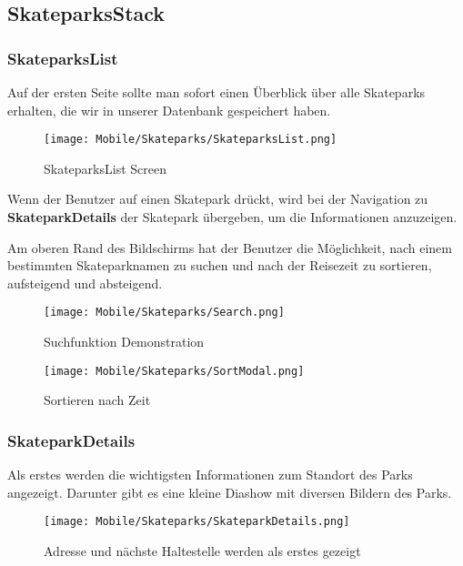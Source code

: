 \subsection{SkateparksStack}
\subsubsection{SkateparksList}
Auf der ersten Seite sollte man sofort einen Überblick über alle Skateparks erhalten, die wir in
unserer Datenbank gespeichert haben.

\begin{figure}[H]
  \begin{center}
    \texttt{[image: Mobile/Skateparks/SkateparksList.png]}
    \caption{SkateparksList Screen}
  \end{center}
\end{figure}

Wenn der Benutzer auf einen Skatepark drückt, wird bei der Navigation zu \textbf{SkateparkDetails} der
Skatepark übergeben, um die Informationen anzuzeigen.

Am oberen Rand des Bildschirms hat der Benutzer die Möglichkeit, nach einem bestimmten
Skateparknamen zu suchen und nach der Reisezeit zu sortieren, aufsteigend und absteigend.

\begin{figure}[H]
  \begin{center}
    \texttt{[image: Mobile/Skateparks/Search.png]}
    \caption{Suchfunktion Demonstration}
  \end{center}
\end{figure}

\begin{figure}[H]
  \begin{center}
    \texttt{[image: Mobile/Skateparks/SortModal.png]}
    \caption{Sortieren nach Zeit}
  \end{center}
\end{figure}

\newpage

\subsubsection{SkateparkDetails}
Als erstes werden die wichtigsten Informationen zum Standort des Parks angezeigt. Darunter gibt es
eine kleine Diashow mit diversen Bildern des Parks.

\begin{figure}[H]
  \begin{center}
    \texttt{[image: Mobile/Skateparks/SkateparkDetails.png]}
    \caption{Adresse und nächste Haltestelle werden als erstes gezeigt}
  \end{center}
\end{figure}

